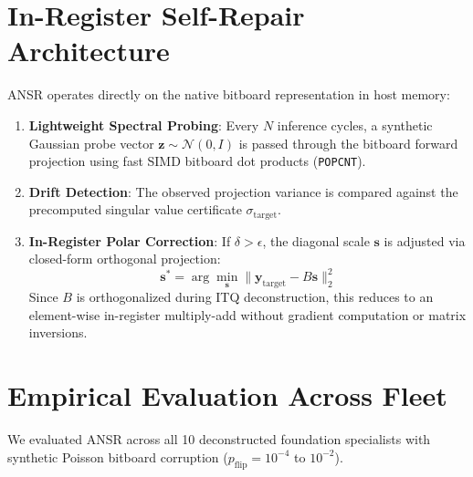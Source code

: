 \documentclass[10pt,twocolumn,letterpaper]{article}
\begin{document}
\section{In-Register Self-Repair Architecture}
ANSR operates directly on the native bitboard representation in host memory:
\begin{enumerate}
    \item \textbf{Lightweight Spectral Probing}: Every $N$ inference cycles, a synthetic Gaussian probe vector $\mathbf{z} \sim \mathcal{N}(0, I)$ is passed through the bitboard forward projection using fast SIMD bitboard dot products (\texttt{POPCNT}).
    \item \textbf{Drift Detection}: The observed projection variance is compared against the precomputed singular value certificate $\sigma_{\text{target}}$.
    \item \textbf{In-Register Polar Correction}: If $\delta > \epsilon$, the diagonal scale $\mathbf{s}$ is adjusted via closed-form orthogonal projection:
    \begin{equation}
    \mathbf{s}^* = \arg\min_{\mathbf{s}} \| \mathbf{y}_{\text{target}} - B \mathbf{s} \|_2^2
    \end{equation}
    Since $B$ is orthogonalized during ITQ deconstruction, this reduces to an element-wise in-register multiply-add without gradient computation or matrix inversions.
\end{enumerate}

\section{Empirical Evaluation Across Fleet}
We evaluated ANSR across all 10 deconstructed foundation specialists with synthetic Poisson bitboard corruption ($p_{\text{flip}} = 10^{-4}$ to $10^{-2}$).
\end{document}
